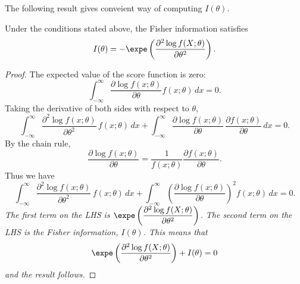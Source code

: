 The following result gives conveient way of computing $I(\theta)$.
\begin{lemma}\label{lem:fisher}
Under the conditions stated above, the Fisher information satisfies
\[
I(\theta) = -\expe\left(\frac{\partial^2\log f(X;\theta)}{\partial\theta^2}\right).
\]
\end{lemma}

\begin{proof}
The expected value of the score function is zero:
\[
\int_{-\infty}^{\infty} \frac{\partial\log f(x;\theta)}{\partial\theta}f(x;\theta) \,dx = 0.
\]
Taking the derivative of both sides with respect to $\theta$,
\[
\int_{-\infty}^{\infty} \frac{\partial^2\log f(x;\theta)}{\partial\theta^2}\,f(x;\theta) \,dx 
+
\int_{-\infty}^{\infty} \frac{\partial\log f(x;\theta)}{\partial\theta}\,\frac{\partial f(x;\theta)}{\partial\theta} \,dx 
= 0.
\]
By the chain rule, 
\[
\frac{\partial\log f(x;\theta)}{\partial\theta}  = \frac{1}{f(x;\theta)}\frac{\partial f(x;\theta)}{\partial\theta}.
\]
Thus we have
\[
\int_{-\infty}^{\infty} \frac{\partial^2\log f(x;\theta)}{\partial\theta^2}\,f(x;\theta) \,dx 
+
\int_{-\infty}^{\infty} \left(\frac{\partial\log f(x;\theta)}{\partial\theta}\right)^2f(x;\theta)\,dx 
= 0.
\]
\bit
\it The first term on the LHS is $\displaystyle\expe\left(\frac{\partial^2\log f(X;\theta)}{\partial\theta^2}\right)$.
\it The second term on the LHS is the Fisher information, $I(\theta)$.
\eit
This means that
\[
\expe\left(\frac{\partial^2\log f(X;\theta)}{\partial\theta^2}\right) + I(\theta) = 0
\]
and the result follows.
%
\end{proof}

